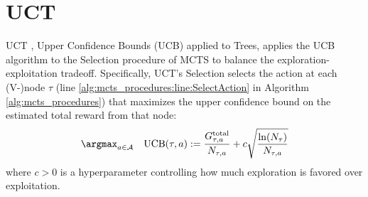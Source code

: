 \newpage\clearpage
\section{UCT}
\label{sec:UCT}
UCT \cite{uct}, Upper Confidence Bounds (UCB) applied to Trees, applies the UCB algorithm \cite{ucb} to the Selection procedure of MCTS to balance the exploration-exploitation tradeoff.
Specifically, UCT's Selection selects the action at each (V-)node $\tau$ (line \ref{alg:mcts_procedures:line:SelectAction} in Algorithm \ref{alg:mcts_procedures}) that maximizes the upper confidence bound on the estimated total reward from that node:
\begin{align*}
    \argmax_{a\in\mathcal{A}} \quad {\rm UCB}(\tau,a):= \frac{G^{\rm total}_{\tau,a}}{N_{\tau,a}} + c\sqrt{\frac{\ln(N_\tau)}{N_{\tau,a}}}
\end{align*}
where $c>0$ is a hyperparameter controlling how much exploration is favored over exploitation. 




